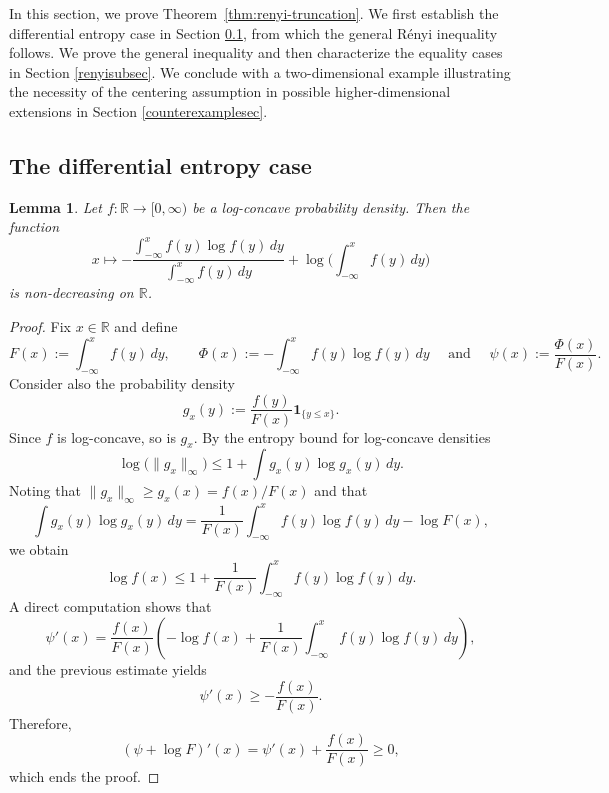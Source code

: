 \documentclass{article}
\theoremstyle{plain}
\newtheorem{lemma}[theorem]{Lemma}
\theoremstyle{definition}
\newcommand{\1}{\mathbf 1}
\newcommand\lampros[1]{\todo[size=\tiny, color=orange]{lg: #1}}
\begin{document}
In this section, we prove Theorem~\ref{thm:renyi-truncation}.
We first establish the differential entropy case in Section \ref{diffentropysubsec}, from which the general
Rényi inequality follows. We prove the general inequality and then characterize the equality cases in Section \ref{renyisubsec}. We
conclude with a two-dimensional example illustrating the necessity
of the centering assumption in possible higher-dimensional extensions in Section \ref{counterexamplesec}.


\subsection{The differential entropy case} \label{diffentropysubsec}

\begin{lemma}
Let $f:\mathbb{R}\to[0,\infty)$ be a log-concave probability density. 
Then the function
\[
x\longmapsto -\frac{\int_{-\infty}^x f(y)\log f(y)\,dy}{\int_{-\infty}^x f(y)\,dy}+\log \Biggl(\int_{-\infty}^x f(y)\,dy\Biggr)
\]
is non-decreasing on $\mathbb{R}$.
\end{lemma}

\begin{proof}
Fix $x\in\mathbb{R}$ and define 
\[
F(x):=\int_{-\infty}^x f(y)\,dy,
\qquad
\Phi(x):=-\int_{-\infty}^x f(y)\log f(y)\,dy \quad \text{ and } \quad \psi(x):=\frac{\Phi(x)}{F(x)}.
\]
Consider also the probability density
\[
g_x(y):=\frac{f(y)}{F(x)}\mathbf{1}_{\{y\le x\}}.
\]
Since $f$ is log-concave, so is $g_x$. By the entropy bound for log-concave densities~\cite{fradelizi2008increasing}
\begin{equation} \label{matthieusineq}
\log\big(\|g_x\|_\infty\big)\le 1+\int g_x(y)\log g_x(y)\,dy.
\end{equation}
Noting that $\|g_x\|_\infty\ge g_x(x)=f(x)/F(x)$ and that
\[
\int g_x(y)\log g_x(y)\,dy
=
\frac{1}{F(x)}\int_{-\infty}^x f(y)\log f(y)\,dy-\log F(x),
\]
we obtain
\[
\log f(x)\le 1+\frac{1}{F(x)}\int_{-\infty}^x f(y)\log f(y)\,dy.
\]
A direct computation shows that
\[
\psi'(x)
=
\frac{f(x)}{F(x)}
\left(
-\log f(x)
+
\frac{1}{F(x)}\int_{-\infty}^x f(y)\log f(y)\,dy
\right),
\]
and the previous estimate yields
\[
\psi'(x)\ge -\frac{f(x)}{F(x)}.
\]
Therefore,
\[
(\psi+\log F)'(x)
=
\psi'(x)+\frac{f(x)}{F(x)}
\ge 0,
\]
which ends the proof.
\end{proof}

\end{document}
